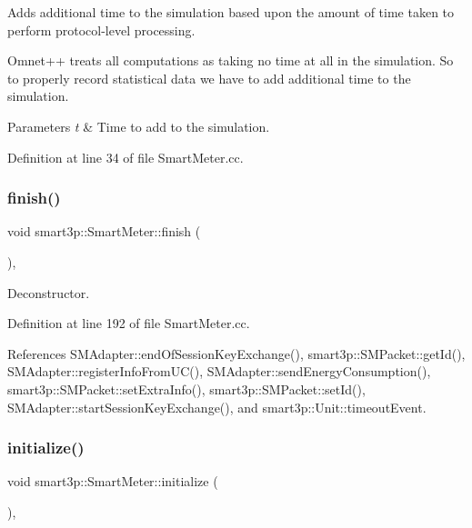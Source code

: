 Adds additional time to the simulation based upon the amount of time taken to perform protocol-\/level processing.

Omnet++ treats all computations as taking no time at all in the simulation. So to properly record statistical data we have to add additional time to the simulation. 
\begin{DoxyParams}{Parameters}
{\em t} & Time to add to the simulation. \\
\hline
\end{DoxyParams}


Definition at line 34 of file Smart\+Meter.\+cc.

\mbox{\label{classsmart3p_1_1SmartMeter_a315ed406035dff5decd3e0f739893f0b}} 
\subsubsection{\texorpdfstring{finish()}{finish()}}
{\footnotesize\ttfamily void smart3p\+::\+Smart\+Meter\+::finish (\begin{DoxyParamCaption}{ }\end{DoxyParamCaption})\hspace{0.3cm}{\ttfamily [protected]}, {\ttfamily [virtual]}}



Deconstructor. 



Definition at line 192 of file Smart\+Meter.\+cc.



References S\+M\+Adapter\+::end\+Of\+Session\+Key\+Exchange(), smart3p\+::\+S\+M\+Packet\+::get\+Id(), S\+M\+Adapter\+::register\+Info\+From\+U\+C(), S\+M\+Adapter\+::send\+Energy\+Consumption(), smart3p\+::\+S\+M\+Packet\+::set\+Extra\+Info(), smart3p\+::\+S\+M\+Packet\+::set\+Id(), S\+M\+Adapter\+::start\+Session\+Key\+Exchange(), and smart3p\+::\+Unit\+::timeout\+Event.

\mbox{\label{classsmart3p_1_1SmartMeter_a289d547f41c3f011e99bc0eaf5bd945b}} 
\subsubsection{\texorpdfstring{initialize()}{initialize()}}
{\footnotesize\ttfamily void smart3p\+::\+Smart\+Meter\+::initialize (\begin{DoxyParamCaption}{ }\end{DoxyParamCaption})\hspace{0.3cm}{\ttfamily [protected]}, {\ttfamily [virtual]}}



